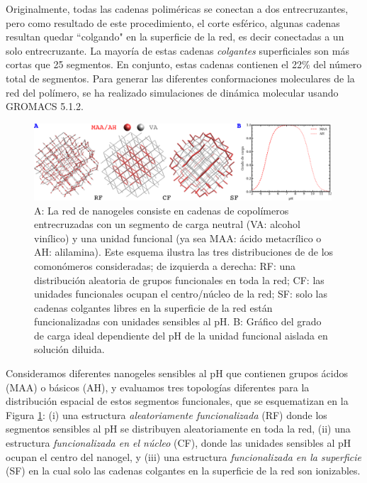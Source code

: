 Originalmente, todas las cadenas polim\'ericas se  conectan a dos entrecruzantes, pero como resultado de este procedimiento, el corte esf\'erico, algunas cadenas resultan quedar ``colgando" en la superficie de la red, es decir  conectadas a un solo entrecruzante. La mayor\'ia de estas cadenas \emph{colgantes} superficiales son m\'as cortas que 25 segmentos. En conjunto, estas cadenas contienen el 22\% del n\'umero total de segmentos. Para generar las diferentes conformaciones moleculares de la red del pol\'imero, se ha realizado simulaciones de din\'amica molecular usando GROMACS 5.1.2\cite{lindahl2001gromacs}.

 \begin{figure}[!htb]
     \centering
     \includegraphics[width=0.99\textwidth]{Figures/graphs-gel2/ideal-charge-model.pdf}
     \caption{A: La red de nanogeles consiste en cadenas de copol\'imeros entrecruzadas con un segmento de carga neutral (VA: alcohol vin\'ilico) y una unidad funcional (ya sea MAA: \'acido metacr\'ilico o AH: alilamina).
     	Este esquema ilustra las tres distribuciones de de los comon\'omeros consideradas; de izquierda a derecha: RF: una distribuci\'on aleatoria de grupos funcionales en toda la red; CF: las unidades funcionales ocupan el centro/n\'ucleo de la red; SF: solo las cadenas colgantes libres en la superficie de la red est\'an funcionalizadas con unidades sensibles al pH.
     	B: Gr\'afico del grado de carga ideal dependiente del pH de la unidad funcional aislada en soluci\'on diluida.}
     \label{fig:esf:gel-topologies}
 \end{figure}


 
 
 Consideramos diferentes nanogeles sensibles al pH que contienen grupos \'acidos (MAA) o b\'asicos (AH), y evaluamos tres topolog\'ias diferentes para la distribuci\'on espacial de estos segmentos funcionales, que se esquematizan en la Figura \ref{fig:esf:gel-topologies}:
 (i) una estructura \emph{aleatoriamente funcionalizada} (RF) donde los segmentos sensibles al pH se distribuyen aleatoriamente en toda la red,
 (ii) una estructura \emph{funcionalizada en el n\'ucleo} (CF), donde las unidades sensibles al pH ocupan el centro del nanogel, y
 (iii) una estructura \emph{funcionalizada en la superficie} (SF) en la cual solo las cadenas colgantes en la superficie de la red son ionizables.
  







